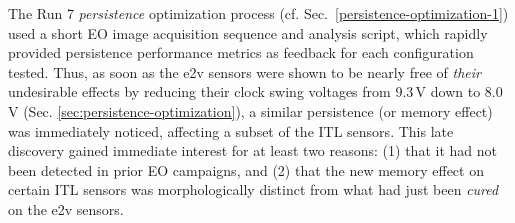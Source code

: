 The Run 7 {\it persistence} optimization process (cf. Sec.~\ref{persistence-optimization-1}) used a short EO image acquisition sequence and analysis script, which rapidly provided persistence performance metrics as feedback for each configuration tested. Thus, as soon as the e2v sensors were shown to be nearly free of {\it their} undesirable effects by reducing their clock swing voltages from 9.3\,V down to 8.0\,V (Sec. \ref{sec:persistence-optimization}), a similar persistence (or memory effect) was immediately noticed, affecting a subset of the ITL sensors. This late discovery gained immediate interest for at least two reasons: (1) that it had not been detected in prior EO campaigns, and (2) that the new memory effect on certain ITL sensors was morphologically distinct from what had just been {\it cured} on the e2v sensors. 

